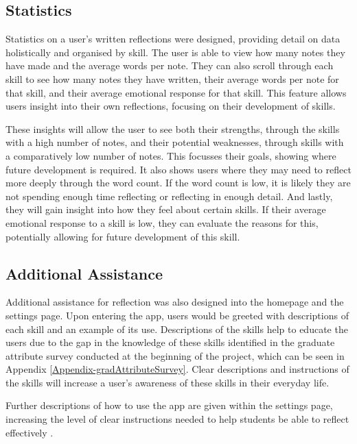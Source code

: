 \documentclass{l4proj}
\begin{document}
\subsection{Statistics}

Statistics on a user's written reflections were designed, providing detail on data holistically and organised by skill. The user is able to view how many notes they have made and the average words per note. They can also scroll through each skill to see how many notes they have written, their average words per note for that skill, and their average emotional response for that skill. This feature allows users insight into their own reflections, focusing on their development of skills.  

These insights will allow the user to see both their strengths, through the skills with a high number of notes, and their potential weaknesses, through skills with a comparatively low number of notes. This focusses their goals, showing where future development is required. It also shows users where they may need to reflect more deeply through the word count. If the word count is low, it is likely they are not spending enough time reflecting or reflecting in enough detail. And lastly, they will gain insight into how they feel about certain skills. If their average emotional response to a skill is low, they can evaluate the reasons for this, potentially allowing for future development of this skill.


\subsection{Additional Assistance}

Additional assistance for reflection was also designed into the homepage and the settings page. Upon entering the app, users would be greeted with descriptions of each skill and an example of its use. Descriptions of the skills help to educate the users due to the gap in the knowledge of these skills identified in the graduate attribute survey conducted at the beginning of the project, which can be seen in Appendix \ref{Appendix-gradAttributeSurvey}. Clear descriptions and instructions of the skills will increase a user’s awareness of these skills in their everyday life.

Further descriptions of how to use the app are given within the settings page, increasing the level of clear instructions needed to help students be able to reflect effectively \citep{bruno_reflective_2018}.
\end{document}
